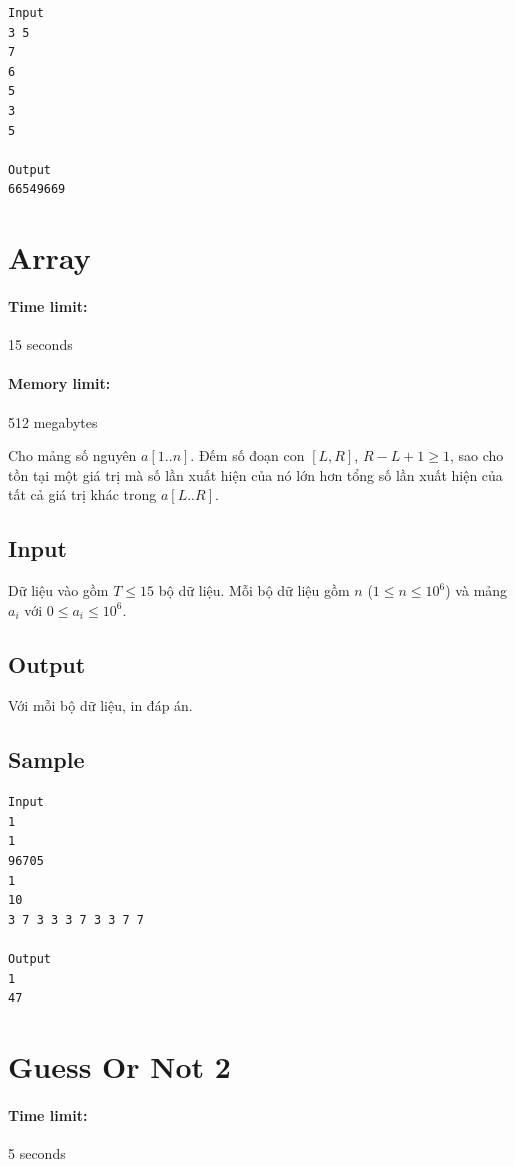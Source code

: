 \documentclass[11pt]{article}
\begin{document}
\begin{verbatim}
Input
3 5
7
6
5
3
5

Output
66549669
\end{verbatim}

\section{Array}

\paragraph{Time limit:} 15 seconds
\paragraph{Memory limit:} 512 megabytes

Cho mảng số nguyên \(a[1..n]\). Đếm số đoạn con \([L,R]\), \(R-L+1\ge1\),
sao cho tồn tại một giá trị mà số lần xuất hiện của nó lớn hơn tổng số lần
xuất hiện của tất cả giá trị khác trong \(a[L..R]\).

\subsection*{Input}

Dữ liệu vào gồm \(T\le 15\) bộ dữ liệu. Mỗi bộ dữ liệu gồm \(n\)
(\(1\le n\le 10^6\)) và mảng \(a_i\) với \(0\le a_i\le 10^6\).

\subsection*{Output}

Với mỗi bộ dữ liệu, in đáp án.

\subsection*{Sample}

\begin{verbatim}
Input
1
1
96705
1
10
3 7 3 3 3 7 3 3 7 7

Output
1
47
\end{verbatim}

\section{Guess Or Not 2}

\paragraph{Time limit:} 5 seconds
\end{document}
